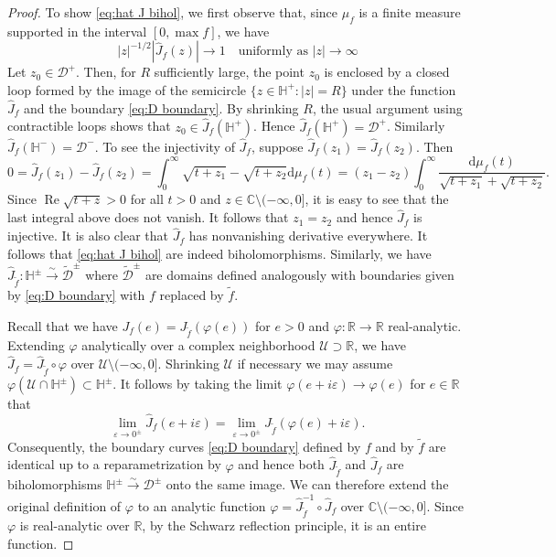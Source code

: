 \documentclass[11pt,letterpaper,oneside]{amsart}
\newcommand{\C}{\mathbb{C}}
\newcommand{\R}{\mathbb{R}}
\renewcommand{\epsilon}{\varepsilon}
\theoremstyle{definition}
\theoremstyle{remark}
\renewcommand{\Re}{\operatorname{Re}}
\newcommand{\inv}{^{-1}}
\newcommand{\wt}{\widetilde}
\newcommand{\wh}{\widehat}
\theoremstyle{definition}
\theoremstyle{remark}
\newcommand{\CD}{\mathcal{D}}
\newcommand{\CU}{\mathcal{U}}
\newcommand{\dif}{\mathrm{d}}
\begin{document}
\begin{proof}
	To show \eqref{eq:hat J bihol}, we first observe that, since $\mu_f$ is a finite measure supported in the interval $[0, \max f]$, we have 
	\begin{equation}\label{eq:hat J asymptotic}
		|z|^{-1/2} |\wh J_f(z)|\to 1 \quad \text{uniformly as $|z| \to \infty$}
	\end{equation}
	Let $z_0 \in \CD^+$.
	Then, for $R$ sufficiently large, the point $z_0$ is enclosed by a closed loop formed by the image of the semicircle $\{z \in \mathbb{H}^+ : |z| = R\}$ under the function $\wh J_f$ and the boundary \eqref{eq:D boundary}.
	By shrinking $R$, the usual argument using contractible loops shows that $z_0 \in \wh J_f(\mathbb{H}^+)$. Hence $\wh J_f(\mathbb{H}^+) = \CD^+$.
	Similarly $\wh J_f(\mathbb{H}^-) = \CD^-$.
	To see the injectivity of $\wh J_f$, suppose $\wh J_f(z_1) = \wh J_f(z_2)$. Then
	\begin{equation*}
		0 = \wh J_f(z_1) -  \wh J_f(z_2) = \int_0^\infty \sqrt{t + z_1} - \sqrt{t + z_2} \dif \mu_f(t) = (z_1 - z_2) \int_0^\infty \frac{\dif \mu_f(t)}{\sqrt{t + z_1} + \sqrt{t + z_2}}.
	\end{equation*}
	Since $\Re \sqrt{t + z} > 0$ for all $t > 0$ and $z \in \C \setminus (-\infty, 0]$, it is easy to see that the last integral above does not vanish. It follows that $z_1 = z_2$ and hence $\wh J_f$ is injective.
	It is also clear that $\wh J_f$ has nonvanishing derivative everywhere. It follows that \eqref{eq:hat J bihol} are indeed biholomorphisms.
	Similarly, we have $\wh J_{\wt f}: \mathbb{H}^\pm \xrightarrow{\sim} \wt{\CD}^\pm$ where $\wt{\CD}^\pm$ are domains defined analogously with boundaries given by \eqref{eq:D boundary} with $f$ replaced by $\wt f$.
	
\medskip

	Recall that we have $J_f(e) = J_{\wt f}(\varphi(e))$ for $e > 0$ and $\varphi: \R \to \R$ real-analytic.
	Extending $\varphi$ analytically over a complex neighborhood $\CU \supset \R$, we have $\wh J_f = \wh J_{\wt f} \circ \varphi$ over $\CU \setminus (-\infty, 0]$.
	Shrinking $\CU$ if necessary we may assume $\varphi(\CU \cap \mathbb{H}^\pm) \subset \mathbb{H}^\pm$.
	It follows by taking the limit $\varphi(e + i \epsilon)\to \varphi(e)$ for $e \in \R$ that 
	\begin{equation*}		\lim_{\epsilon \to 0^\pm} \wh J_f(e + i \epsilon) = \lim_{\epsilon \to 0^\pm} \wh J_{\wt f}(\varphi(e) + i \epsilon).
	\end{equation*}
	Consequently, the boundary curves \eqref{eq:D boundary} defined by $f$ and by $\wt f$ are identical up to a reparametrization by $\varphi$ and hence both $\wh J_{\wt f}$ and $\wh J_f$ are biholomorphisms $\mathbb{H}^\pm \xrightarrow{\sim} \CD^\pm$ onto the same image.
	We can therefore extend the original definition of $\varphi$ to an analytic function $\varphi = \wh J_{\wt f}\inv \circ \wh J_f$  over $\C\setminus (-\infty, 0]$.
	Since $\varphi$ is real-analytic over $\R$, by the Schwarz reflection principle, it is an entire function.


\end{proof}
\end{document}
